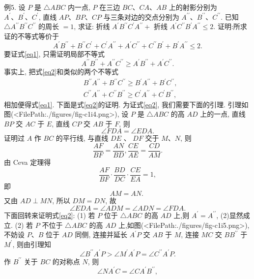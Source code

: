 例5. 设 $P$ 是 $\triangle A B C$ 内一点, $P$ 在三边 $B C 、 C A 、 A B$ 上的射影分别为 $A^{\prime} 、 B^{\prime} 、 C^{\prime}$, 直线 $A P 、 B P 、 C P$ 与三条对边的交点分别为 $A^{\prime \prime} 、 B^{\prime \prime} 、 C^{\prime \prime}$. 已知 $\triangle A^{\prime \prime} B^{\prime \prime} C^{\prime \prime}$ 的周长 $=1$, 求证:
折线 $A^{\prime} B^{\prime \prime} C^{\prime} A^{\prime \prime}+$ 折线 $A^{\prime} C^{\prime \prime} B^{\prime} A^{\prime \prime} \leqslant 2$.
证明:所求证的不等式等价于
$$
A^{\prime} B^{\prime \prime}+B^{\prime \prime} C^{\prime}+C^{\prime} A^{\prime \prime}+A^{\prime} C^{\prime \prime}+C^{\prime \prime} B^{\prime}+B^{\prime} A^{\prime \prime} \leqslant 2 . \label{eq1}
$$
要证式\ref{eq1}, 只需证明局部不等式
$$
A^{\prime \prime} B^{\prime \prime}+A^{\prime \prime} C^{\prime \prime} \geqslant A^{\prime} B^{\prime \prime}+A^{\prime} C^{\prime \prime} . \label{eq2}
$$
事实上, 把式\ref{eq2}和类似的两个不等式
$$
\begin{aligned}
& B^{\prime \prime} A^{\prime \prime}+B^{\prime \prime} C^{\prime \prime} \geqslant B^{\prime} A^{\prime \prime}+B^{\prime} C^{\prime \prime}, \\
& C^{\prime \prime} A^{\prime \prime}+C^{\prime \prime} B^{\prime \prime} \geqslant C^{\prime} A^{\prime \prime}+C^{\prime} B^{\prime \prime},
\end{aligned}
$$
相加便得式\ref{eq1}.
下面是式\ref{eq2}的证明.
为证式\ref{eq2}, 我们需要下面的引理.
引理如图(<FilePath:./figures/fig-c1i4.png>), 设 $P$ 是 $\triangle A B C$ 的高 $A D$ 上的一点, 直线 $B P$ 交 $A C$ 于 $E$, 直线 $C P$ 交 $A B$ 于 $F$, 则
$$
\angle F D A=\angle E D A .
$$
证明过 $A$ 作 $B C$ 的平行线, 与直线 $D E$ 、 $D F$ 交于 $M 、 N$, 则
$$
\frac{A F}{B F}=\frac{A N}{B D}, \frac{C E}{A E}=\frac{C D}{A M} .
$$
由 Ceva 定理得
$$
\frac{A F}{B F} \cdot \frac{B D}{D C} \cdot \frac{C E}{E A}=1,
$$
即
$$
A M=A N \text {. }
$$
又由
$A D \perp M N$,
所以
$D M=D N$,
故
$$
\angle E D A=\angle A D M=\angle A D N=\angle F D A .
$$
下面回转来证明式\ref{eq2}:
(1) 若 $P$ 位于 $\triangle A B C$ 的高 $A D$ 上,则 $A^{\prime}=A^{\prime \prime}$, (2)显然成立.
(2) 若 $P$ 不位于 $\triangle A B C$ 的高 $A D$ 上,如图(<FilePath:./figures/fig-c1i5.png>), 不妨设 $P 、 B$ 位于 $A D$ 同侧, 连接并延长 $A^{\prime} P$ 交 $A B$ 于 $M$, 连接 $M C$ 交 $B B^{\prime \prime}$ 于 $M^{\prime}$, 则由引理知
$$
\angle B^{\prime \prime} A^{\prime} P>\angle M^{\prime} A^{\prime} P=\angle C^{\prime \prime} A^{\prime} P . \label{eq3}
$$
作 $B^{\prime \prime}$ 关于 $B C$ 的对称点 $N$, 则
$$
\angle N A^{\prime} C=\angle C A^{\prime} B^{\prime \prime},
$$
